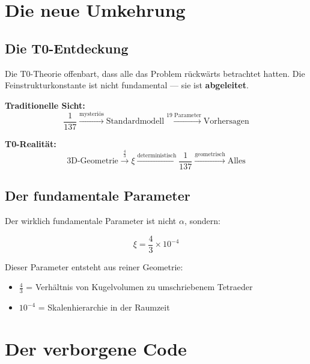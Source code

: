 	\section{Die neue Umkehrung}
	
	\subsection{Die T0-Entdeckung}
	
	Die T0-Theorie offenbart, dass alle das Problem rückwärts betrachtet hatten. Die Feinstrukturkonstante ist nicht fundamental — sie ist \textbf{abgeleitet}.
	
	\begin{tcolorbox}[colback=green!5!white,colframe=green!50!black,title=Der Paradigmenwechsel]
		\textbf{Traditionelle Sicht:}
		\begin{equation}
			\frac{1}{137} \xrightarrow{\text{mysteriös}} \text{Standardmodell} \xrightarrow{\text{19 Parameter}} \text{Vorhersagen}
		\end{equation}
		
		\textbf{T0-Realität:}
		\begin{equation}
			\text{3D-Geometrie} \xrightarrow{\frac{4}{3}} \xi \xrightarrow{\text{deterministisch}} \frac{1}{137} \xrightarrow{\text{geometrisch}} \text{Alles}
		\end{equation}
	\end{tcolorbox}
	
	\subsection{Der fundamentale Parameter}
	
	Der wirklich fundamentale Parameter ist nicht $\alpha$, sondern:
	
	\begin{equation}
		\boxed{\xi = \frac{4}{3} \times 10^{-4}}
	\end{equation}
	
	Dieser Parameter entsteht aus reiner Geometrie:
	\begin{itemize}
		\item $\frac{4}{3}$ = Verhältnis von Kugelvolumen zu umschriebenem Tetraeder
		\item $10^{-4}$ = Skalenhierarchie in der Raumzeit
	\end{itemize}
	
	\section{Der verborgene Code}
	
